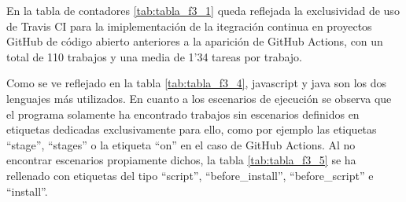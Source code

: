 En la tabla de contadores \ref{tab:tabla_f3_1} queda reflejada la exclusividad de uso de Travis CI para la imiplementación de la itegración continua en proyectos GitHub de código abierto anteriores a la aparición de GitHub Actions, con un total de 110 trabajos y una media de 1'34 tareas por trabajo.

Como se ve reflejado en la tabla \ref{tab:tabla_f3_4}, javascript y java son los dos lenguajes más utilizados. En cuanto a los escenarios de ejecución se observa que el programa solamente ha encontrado trabajos sin escenarios definidos en etiquetas dedicadas exclusivamente para ello, como por ejemplo las etiquetas ``stage'', ``stages'' o la etiqueta ``on'' en el caso de GitHub Actions. Al no encontrar escenarios propiamente dichos, la tabla \ref{tab:tabla_f3_5} se ha rellenado con etiquetas del tipo ``script'', ``before\_install'', ``before\_script'' e ``install''.
